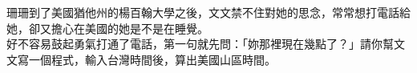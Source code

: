珊珊到了美國猶他州的楊百翰大學之後，文文禁不住對她的思念，常常想打電話給她，卻又擔心在美國的她是不是在睡覺。\\
好不容易鼓起勇氣打通了電話，第一句就先問：「妳那裡現在幾點了？」請你幫文文寫一個程式，輸入台灣時間後，算出美國山區時間。\\

